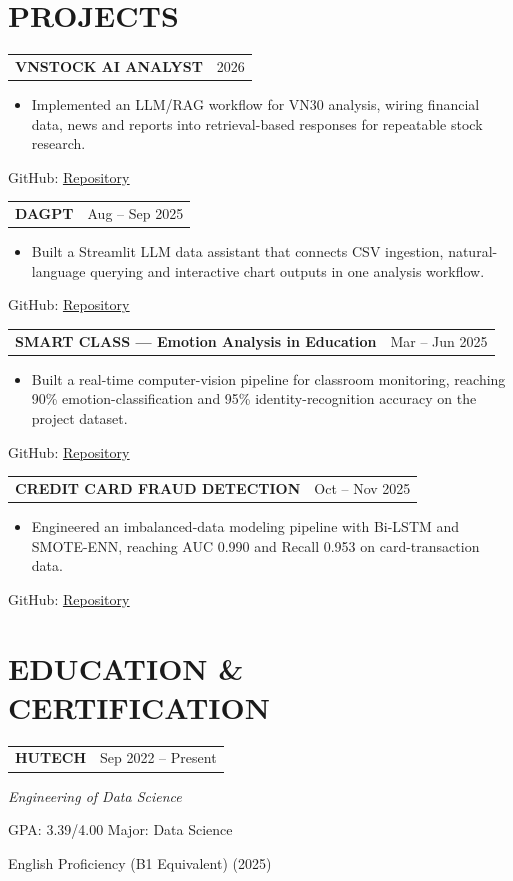 \documentclass[10pt,letterpaper]{article}
\makeatletter
\newcommand{\cvsection}[2]{\section*{\faIcon{#1}\hspace{0.45em}#2}}
\newcommand{\cvlink}[2]{\href{#1}{\underline{#2}}}
\newcommand{\projectentry}[4]{%
  \begin{tabularx}{\textwidth}{@{}X>{\raggedleft\arraybackslash}p{1.52in}@{}}
    \textbf{#1} & \normalsize #2 \\
  \end{tabularx}\par
  \begin{itemize}[leftmargin=1.75em,itemsep=0em,topsep=0.08em,parsep=0em,partopsep=0em]
    \item \small #3
  \end{itemize}
  \small\hspace{1.15em}GitHub: \cvlink{#4}{Repository}\par
}
\makeatother
\begin{document}
\cvsection{briefcase}{PROJECTS}
\projectentry{VNSTOCK AI ANALYST}{2026}{Implemented an LLM/RAG workflow for VN30 analysis, wiring financial data, news and reports into retrieval-based responses for repeatable stock research.}{https://github.com/lehoanggiavi/VNStock_AI}
\vspace{0.16em}
\projectentry{DAGPT}{Aug -- Sep 2025}{Built a Streamlit LLM data assistant that connects CSV ingestion, natural-language querying and interactive chart outputs in one analysis workflow.}{https://github.com/lehoanggiavi/dagpt}
\vspace{0.16em}
\projectentry{SMART CLASS --- Emotion Analysis in Education}{Mar -- Jun 2025}{Built a real-time computer-vision pipeline for classroom monitoring, reaching 90\% emotion-classification and 95\% identity-recognition accuracy on the project dataset.}{https://github.com/lehoanggiavi/smart_class}
\vspace{0.16em}
\projectentry{CREDIT CARD FRAUD DETECTION}{Oct -- Nov 2025}{Engineered an imbalanced-data modeling pipeline with Bi-LSTM and SMOTE-ENN, reaching AUC 0.990 and Recall 0.953 on card-transaction data.}{https://github.com/lehoanggiavi/ccfd}

\cvsection{graduation-cap}{EDUCATION \& CERTIFICATION}
\begin{tabularx}{\textwidth}{@{}X>{\raggedleft\arraybackslash}p{1.52in}@{}}
  \textbf{HUTECH} & \normalsize Sep 2022 -- Present \\
\end{tabularx}\par
\small\textit{Engineering of Data Science}\par
\small GPA: 3.39/4.00 \quad\textbullet\quad Major: Data Science\par
\small English Proficiency (B1 Equivalent) (2025)
\end{document}
